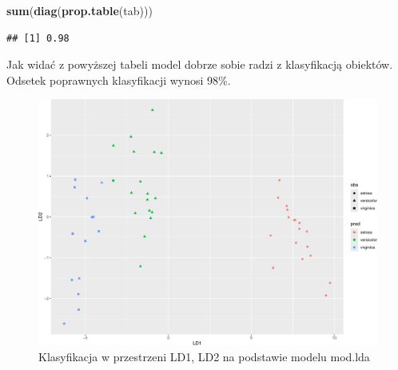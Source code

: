 \documentclass[]{book}
\newenvironment{Shaded}{\begin{snugshade}}{\end{snugshade}}
\newcommand{\DataTypeTok}[1]{\textcolor[rgb]{0.13,0.29,0.53}{#1}}
\newcommand{\KeywordTok}[1]{\textcolor[rgb]{0.13,0.29,0.53}{\textbf{#1}}}
\newcommand{\NormalTok}[1]{#1}
\newcommand{\OperatorTok}[1]{\textcolor[rgb]{0.81,0.36,0.00}{\textbf{#1}}}
\newcommand{\StringTok}[1]{\textcolor[rgb]{0.31,0.60,0.02}{#1}}
\theoremstyle{plain}
\theoremstyle{definition}
\theoremstyle{definition}
\theoremstyle{definition}
\theoremstyle{definition}
\theoremstyle{remark}
\begin{document}
\begin{Shaded}
\begin{Highlighting}[]
\KeywordTok{sum}\NormalTok{(}\KeywordTok{diag}\NormalTok{(}\KeywordTok{prop.table}\NormalTok{(tab)))}
\end{Highlighting}
\end{Shaded}

\begin{verbatim}
## [1] 0.98
\end{verbatim}

Jak widać z powyższej tabeli model dobrze sobie radzi z klasyfikacją obiektów. Odsetek poprawnych klasyfikacji wynosi 98\%.

\begin{Shaded}
\end{Shaded}

\begin{figure}

{\centering \includegraphics{EksploracjaDanych_files/figure-latex/unnamed-chunk-59-1} 

}

\caption{Klasyfikacja w przestrzeni LD1, LD2 na podstawie modelu mod.lda}\label{fig:unnamed-chunk-59}
\end{figure}
\end{document}
